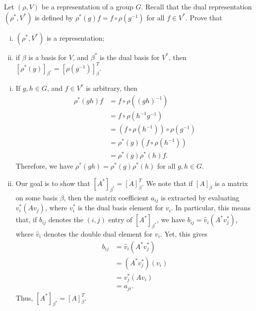 \documentclass[10pt]{mypackage}
\begin{document}
\begin{problem}[Problem 2]
  Let $\left( \rho,V \right)$ be a representation of a group $G$. Recall that the dual representation $\left( \rho^{\ast},V^{\ast} \right)$ is defined by $\rho^{\ast}\left( g \right)f = f\circ \rho\left( g^{-1} \right)$ for all $f\in V^{\ast}$. Prove that
  \begin{enumerate}[(i)]
    \item $\left( \rho^{\ast},V^{\ast} \right)$ is a representation;
    \item if $\beta$ is a basis for $V$, and $\beta^{\ast}$ is the dual basis for $V^{\ast}$, then $\left[ \rho^{\ast}\left( g \right) \right]_{\beta^{\ast}} = \left[ \rho\left( g^{-1} \right) \right]_{\beta}^{T}$. 
  \end{enumerate}
\end{problem}
\begin{solution}\hfill
  \begin{enumerate}[(i)]
    \item If $g,h\in G$, and $f\in V^{\ast}$ is arbitrary, then
      \begin{align*}
        \rho^{\ast}\left( gh \right)f &= f\circ \rho\left( \left( gh \right)^{-1} \right)\\
                                      &= f\circ \rho\left( h^{-1}g^{-1} \right)\\
                                      &= \left( f\circ \rho\left( h^{-1} \right) \right)\circ \rho\left( g^{-1} \right)\\
                                      &= \rho^{\ast}\left( g \right)\left( f\circ \rho\left( h^{-1} \right) \right)\\
                                      &= \rho^{\ast}\left( g \right)\rho^{\ast}\left( h \right)f.
      \end{align*}
      Therefore, we have $\rho^{\ast}\left( gh \right) = \rho^{\ast}\left( g \right)\rho^{\ast}\left( h \right)$ for all $g,h\in G$.
    \item Our goal is to show that $\left[ A^{\ast} \right]_{\beta^{\ast}} = \left[ A \right]_{\beta}^{T}$. We note that if $\left[ A \right]_{\beta}$ is a matrix on some basis $\beta$, then the matrix coefficient $a_{ij}$ is extracted by evaluating $v_i^{\ast}\left( Av_j \right)$, where $v_i^{\ast}$ is the dual basis element for $v_i$. In particular, this means that, if $b_{ij}$ denotes the $\left( i,j \right)$ entry of $\left[ A^{\ast} \right]_{\beta^{\ast}}$, we have $b_{ij} = \hat{v}_i\left( A^{\ast}v_j^{\ast} \right)$, where $\hat{v}_i$ denotes the double dual element for $v_i$. Yet, this gives
      \begin{align*}
        b_{ij} &= \hat{v}_i\left( A^{\ast}v_j^{\ast} \right)\\
               &= \left( A^{\ast}v_j^{\ast} \right)\left( v_i \right)\\
               &= v_j^{\ast}\left( Av_i \right)\\
               &= a_{ji}.
      \end{align*}
      Thus, $\left[ A^{\ast} \right]_{\beta^{\ast}} = \left[ A \right]_{\beta}^{T}$.
  \end{enumerate}
\end{solution}
\end{document}
